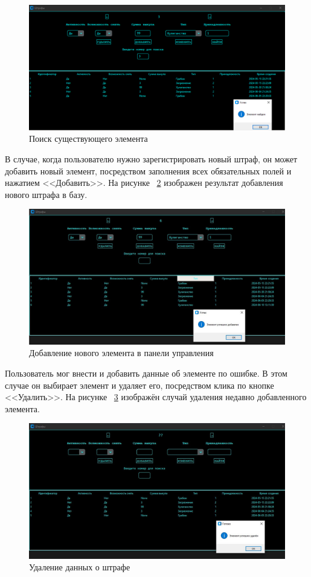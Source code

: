 \begin{figure}[H]
	\centering
	\includegraphics[width=1.0\linewidth]{images/Example7}
	\caption{Поиск существующего элемента}
	\label{fig:example7}
\end{figure}
В случае, когда пользователю нужно зарегистрировать новый штраф, он может добавить новый элемент, посредством заполнения всех обязательных полей и нажатием <<Добавить>>. На рисунке ~\ref{fig:example8} изображен результат добавления нового штрафа в базу.
\begin{figure}[H]
	\centering
	\includegraphics[width=1.0\linewidth]{images/Example8}
	\caption{Добавление нового элемента в панели управления}
	\label{fig:example8}
\end{figure}
Пользователь мог внести и добавить данные об элементе по ошибке. В этом случае он выбирает элемент и удаляет его, посредством клика по кнопке <<Удалить>>.
На рисунке ~\ref{fig:example9} изображён случай удаления недавно добавленного элемента.
\begin{figure}[H]
	\centering
	\includegraphics[width=1.0\linewidth]{images/Example9}
	\caption{Удаление данных о штрафе}
	\label{fig:example9}
\end{figure}

